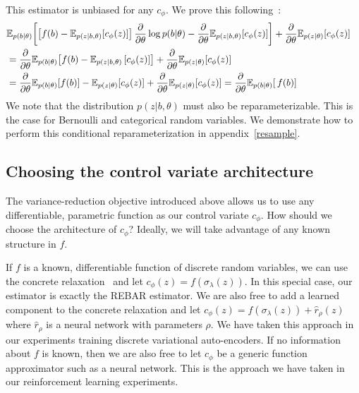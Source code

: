 \documentclass{article}
\newcommand{\discreteDist}{p(b|\theta)}
\newcommand{\loss}{f(b)}
\newcommand{\expectedLoss}{\mathbb{E}_{\discreteDist{}} \! \left[ \, \loss{} \right]}
\newcommand{\E}{\mathbb{E}}
\newcommand{\PT}{\frac{\partial}{\partial \theta}}
\begin{document}
This estimator is unbiased for any $c_\phi$.
We prove this following~\cite{tucker2017rebar}:
%
\begin{align}
\E_{p(b|\theta)} \! \left[\left[ f(b) - \E_{p(z|b, \theta)} \! \left[c_\phi(z) \right] \right]\PT \log p(b|\theta)  - \PT \E_{p(z|b, \theta)} \! \left[c_\phi(z) \right] \right] + \PT\E_{p(z|\theta)} \! \left[ c_\phi(z) \right] \span & \nonumber\\
&= \PT \E_{p(b|\theta)} \! \left[ f(b) - \E_{p(z|b, \theta)}\left[ c_\phi(z) \right]  \right] + \PT\E_{p(z|\theta)} \! \left[ c_\phi(z) \right]\nonumber\\
&= \PT \E_{p(b|\theta)} \! \left[ f(b) \right] - \E_{p(z|\theta)} \! \left[ c_\phi(z) \right] + \PT\E_{p(z|\theta)} \! \left[ c_\phi(z) \right]
= \PT \expectedLoss{}%
\end{align}
%
We note that the distribution $p(z|b,\theta)$ must also be reparameterizable.
This is the case for Bernoulli and categorical random variables.
We demonstrate how to perform this conditional reparameterization in appendix~\ref{resample}.

\subsection{Choosing the control variate architecture}
The variance-reduction objective introduced above allows us to use any differentiable, parametric function as our control variate $c_\phi$. 
How should we choose the architecture of $c_\phi$?
Ideally, we will take advantage of any known structure in $f$.

If $f$ is a known, differentiable function of discrete random variables, we can use the concrete relaxation~\cite{maddison2016concrete} and let $c_\phi(z) = f(\sigma_\lambda(z))$.
In this special case, our estimator is exactly the REBAR estimator.
We are also free to add a learned component to the concrete relaxation and let $c_\phi(z) = f(\sigma_\lambda(z)) + \hat{r}_\rho(z)$ where $\hat{r}_\rho$ is a neural network with parameters $\rho$.
We have taken this approach in our experiments training discrete variational auto-encoders.
If no information about $f$ is known, then we are also free to let $c_\phi$ be a generic function approximator such as a neural network.
This is the approach we have taken in our reinforcement learning experiments.
\end{document}

